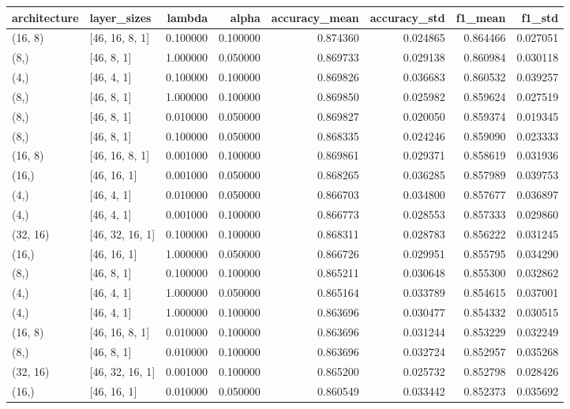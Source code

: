 \begin{tabular}{llrrrrrr}
\toprule
architecture & layer_sizes & lambda & alpha & accuracy_mean & accuracy_std & f1_mean & f1_std \\
\midrule
(16, 8) & [46, 16, 8, 1] & 0.100000 & 0.100000 & 0.874360 & 0.024865 & 0.864466 & 0.027051 \\
(8,) & [46, 8, 1] & 1.000000 & 0.050000 & 0.869733 & 0.029138 & 0.860984 & 0.030118 \\
(4,) & [46, 4, 1] & 0.100000 & 0.100000 & 0.869826 & 0.036683 & 0.860532 & 0.039257 \\
(8,) & [46, 8, 1] & 1.000000 & 0.100000 & 0.869850 & 0.025982 & 0.859624 & 0.027519 \\
(8,) & [46, 8, 1] & 0.010000 & 0.050000 & 0.869827 & 0.020050 & 0.859374 & 0.019345 \\
(8,) & [46, 8, 1] & 0.100000 & 0.050000 & 0.868335 & 0.024246 & 0.859090 & 0.023333 \\
(16, 8) & [46, 16, 8, 1] & 0.001000 & 0.100000 & 0.869861 & 0.029371 & 0.858619 & 0.031936 \\
(16,) & [46, 16, 1] & 0.001000 & 0.050000 & 0.868265 & 0.036285 & 0.857989 & 0.039753 \\
(4,) & [46, 4, 1] & 0.010000 & 0.050000 & 0.866703 & 0.034800 & 0.857677 & 0.036897 \\
(4,) & [46, 4, 1] & 0.001000 & 0.100000 & 0.866773 & 0.028553 & 0.857333 & 0.029860 \\
(32, 16) & [46, 32, 16, 1] & 0.100000 & 0.100000 & 0.868311 & 0.028783 & 0.856222 & 0.031245 \\
(16,) & [46, 16, 1] & 1.000000 & 0.050000 & 0.866726 & 0.029951 & 0.855795 & 0.034290 \\
(8,) & [46, 8, 1] & 0.100000 & 0.100000 & 0.865211 & 0.030648 & 0.855300 & 0.032862 \\
(4,) & [46, 4, 1] & 1.000000 & 0.050000 & 0.865164 & 0.033789 & 0.854615 & 0.037001 \\
(4,) & [46, 4, 1] & 1.000000 & 0.100000 & 0.863696 & 0.030477 & 0.854332 & 0.030515 \\
(16, 8) & [46, 16, 8, 1] & 0.010000 & 0.100000 & 0.863696 & 0.031244 & 0.853229 & 0.032249 \\
(8,) & [46, 8, 1] & 0.010000 & 0.100000 & 0.863696 & 0.032724 & 0.852957 & 0.035268 \\
(32, 16) & [46, 32, 16, 1] & 0.001000 & 0.100000 & 0.865200 & 0.025732 & 0.852798 & 0.028426 \\
(16,) & [46, 16, 1] & 0.010000 & 0.050000 & 0.860549 & 0.033442 & 0.852373 & 0.035692 \\

\end{tabular}
